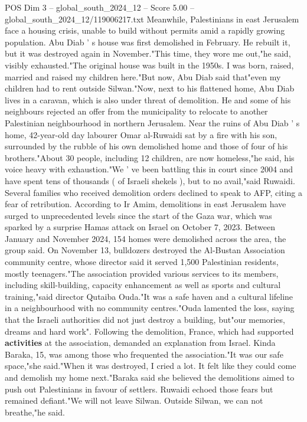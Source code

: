 \begin{textsample}{POS Dim 3 – global\_south\_2024\_12 – Score 5.00 – global\_south\_2024\_12/119006217.txt}
Meanwhile, Palestinians in east Jerusalem face a housing crisis, unable to build without permits amid a rapidly growing population.
Abu Diab ' s house was first demolished in February.
He rebuilt it, but it was destroyed again in November."This time, they wore me out,"he said, visibly exhausted."The original house was built in the 1950s.
I was born, raised, married and raised my children here."But now, Abu Diab said that"even my children had to rent outside Silwan."Now, next to his flattened home, Abu Diab lives in a caravan, which is also under threat of demolition.
He and some of his neighbours rejected an offer from the municipality to relocate to another Palestinian neighbourhood in northern Jerusalem.
Near the ruins of Abu Diab ' s home, 42-year-old day labourer Omar al-Ruwaidi sat by a fire with his son, surrounded by the rubble of his own demolished home and those of four of his brothers."About 30 people, including 12 children, are now homeless,"he said, his voice heavy with exhaustion."We ' ve been battling this in court since 2004 and have spent tens of thousands ( of Israeli shekels ), but to no avail,"said Ruwaidi.
Several families who received demolition orders declined to speak to AFP, citing a fear of retribution.
According to Ir Amim, demolitions in east Jerusalem have surged to unprecedented levels since the start of the Gaza war, which was sparked by a surprise Hamas attack on Israel on October 7, 2023.
Between January and November 2024, 154 homes were demolished across the area, the group said.
On November 13, bulldozers destroyed the Al-Bustan Association community centre, whose director said it served 1,500 Palestinian residents, mostly teenagers."The association provided various services to its members, including skill-building, capacity enhancement as well as sports and cultural training,"said director Qutaiba Ouda."It was a safe haven and a cultural lifeline in a neighbourhood with no community centres."Ouda lamented the loss, saying that the Israeli authorities did not just destroy a building, but"our memories, dreams and hard work".
Following the demolition, France, which had supported \textbf{activities} at the association, demanded an explanation from Israel.
Kinda Baraka, 15, was among those who frequented the association."It was our safe space,"she said."When it was destroyed, I cried a lot.
It felt like they could come and demolish my home next."Baraka said she believed the demolitions aimed to push out Palestinians in favour of settlers.
Ruwaidi echoed those fears but remained defiant."We will not leave Silwan.
Outside Silwan, we can not breathe,"he said.

\end{textsample}
